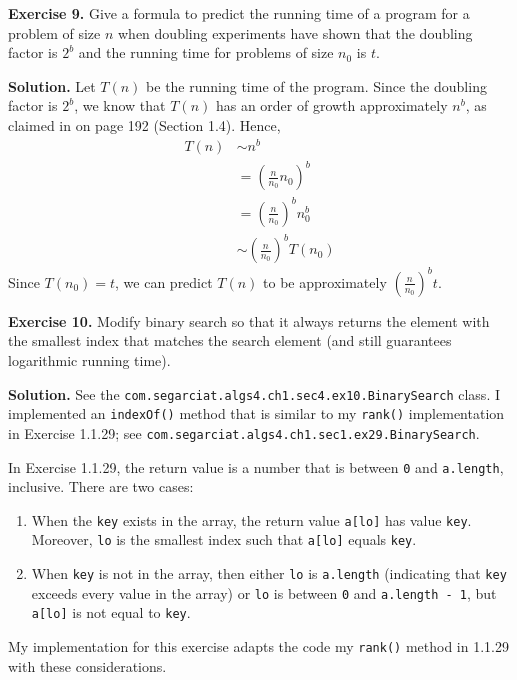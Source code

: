 \documentclass[12pt, a4paper]{article}
\newenvironment{ex}[2][Exercise]
{\par\medskip\noindent \textbf{#1 #2.}}
{\medskip}
\newenvironment{sol}[1][Solution]
{\par\medskip\noindent \textbf{#1.} }
{\medskip}
\begin{document}
	\begin{ex}{9}
		Give a formula to predict the running time of a program for a problem of size $n$
		when doubling experiments have shown that the doubling factor is $2^b$ and the
		running time for problems of size $n_0$ is $t$.
	\end{ex}
	\begin{sol}
		Let $T(n)$ be the running time of the program. Since the doubling factor is $2^b$,
		we know that $T(n)$ has an order of growth approximately $n^b$, as claimed in \cite{sedgewick_wayne}
		on page 192 (Section 1.4). Hence,
		\begin{align*}
			T(n) &\sim n^b\\
			&=\left(\frac{n}{n_0}n_0\right)^b\\
			&=\left(\frac{n}{n_0}\right)^b n_0^b\\
			&\sim \left(\frac{n}{n_0}\right)^b T(n_0)
		\end{align*}
		Since $T(n_0)=t$, we can predict $T(n)$ to be approximately $\left(\frac{n}{n_0}\right)^bt$.
	\end{sol}
	\begin{ex}{10}
		Modify binary search so that it always returns the element with the smallest index that
		matches the search element (and still guarantees logarithmic running time).
	\end{ex}
	\begin{sol}
		See the \texttt{com.segarciat.algs4.ch1.sec4.ex10.BinarySearch} class. I implemented an
		\texttt{indexOf()} method that is similar to my \texttt{rank()} implementation in
		Exercise 1.1.29; see \texttt{com.segarciat.algs4.ch1.sec1.ex29.BinarySearch}.
		
		In Exercise 1.1.29, the return value is a number that is between \texttt{0} and \texttt{a.length},
		inclusive. There are two cases:
		\begin{enumerate}[label=(\roman*)]
			\item When the \texttt{key} exists in the array, the return value \texttt{a[lo]}
			has value \texttt{key}. Moreover, \texttt{lo} is the smallest index such that
			\texttt{a[lo]} equals \texttt{key}.
			\item When \texttt{key} is not in the array, then either \texttt{lo} is \texttt{a.length}
			(indicating that \texttt{key} exceeds every value in the array) or \texttt{lo} is between
			\texttt{0} and \texttt{a.length - 1}, but \texttt{a[lo]} is not equal to \texttt{key}.
		\end{enumerate}
		My implementation for this exercise adapts the code my \texttt{rank()} method in 1.1.29
		with these considerations.
	\end{sol}
\end{document}
